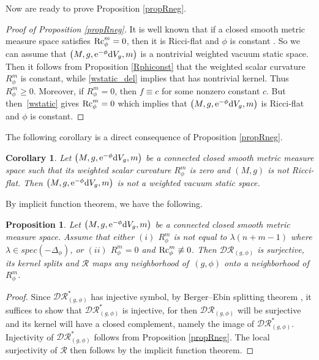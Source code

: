 \documentclass[pdftex]{sigma}
\numberwithin{equation}{section}
\newtheorem{Corollary}[Theorem]{Corollary}
\newtheorem{Proposition}[Theorem]{Proposition}
 { \theoremstyle{definition}
\newtheorem{Definition}[Theorem]{Definition}
\newtheorem{Note}[Theorem]{Note}
\newtheorem{Example}[Theorem]{Example}
\newtheorem{Remark}[Theorem]{Remark} }
\begin{document}
Now are ready to prove Proposition \ref{propRneg}.

\begin{proof}[Proof of Proposition \ref{propRneg}]
It is well known that if a closed smooth metric measure space satisfies ${\rm Rc}_\phi^m=0$, then it is Ricci-flat and $\phi$ is constant \cite{KimKim}. So we can assume that $\bigl(M,g,{\rm e}^{-\phi}{\rm d}V_g,m\bigr)$ is a nontrivial weighted vacuum static space.
Then it follows from Proposition \ref{Rphiconst} that
the weighted scalar curvature $R_\phi^m$ is constant, while \eqref{wstatic_del} implies that  has nontrivial kernel. Thus $R_\phi^m\geq0$. Moreover, if $R_\phi^m=0$, then $f\equiv c$ for some nonzero constant $c$. But then~\eqref{wstatic} gives ${\rm Rc}_\phi^m=0$ which implies that $\bigl(M,g,{\rm e}^{-\phi}{\rm d}V_g,m\bigr)$ is Ricci-flat and $\phi$ is constant.
\end{proof}

The following corollary is a direct consequence of Proposition \ref{propRneg}.

\begin{Corollary}\label{cor4.2}
Let $\bigl(M,g,{\rm e}^{-\phi}{\rm d}V_g,m\bigr)$ be a connected closed smooth metric measure space
such that its weighted scalar curvature $R_\phi^m$ is zero
and $(M,g)$ is not Ricci-flat.
Then $\bigl(M,g,{\rm e}^{-\phi}{\rm d}V_g,m\bigr)$
is not a weighted vacuum static space.
\end{Corollary}

By implicit function theorem, we have the following.
\begin{Proposition}\label{prop3.6}
 Let $\bigl(M,g,{\rm e}^{-\phi}{\rm d}V_g,m\bigr)$ be a connected closed smooth metric measure space. Assume that either $(i)$ $R_\phi^m$ is not equal to $\lambda(n+m-1)$ where $\lambda\in spec(-\Delta_\phi)$, or $(ii)$ $R_\phi^m=0$ and ${\rm Rc}_\phi^m\not\equiv 0$. Then $\mathcal{DR}_{(g,\phi)}$ is surjective, its kernel splits and $\mathcal{R}$ maps any neighborhood of~$(g,\phi)$ onto a neighborhood of $R_\phi^m$.
\end{Proposition}
\begin{proof}
 Since $\mathcal{DR}_{(g,\phi)}^*$ has injective symbol, by Berger--Ebin splitting theorem \cite{Berger&Ebin}, it suffices to show that $\mathcal{DR}_{(g,\phi)}^*$ is injective, for then $\mathcal{DR}_{(g,\phi)}$ will be surjective and its kernel will have a closed complement, namely  the image of $\mathcal{DR}_{(g,\phi)}^*$. Injectivity of $\mathcal{DR}_{(g,\phi)}^*$ follows from Proposition \ref{propRneg}. The local surjectivity of $\mathcal{R}$ then follows by the implicit function theorem.
\end{proof}
\end{document}
